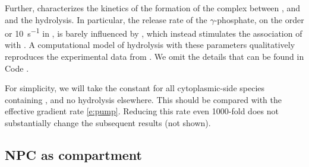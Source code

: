 \documentclass[12pt,notitlepage]{article}
\def\[#1\]{\begin{align}#1\end{align}}
\begin{document}
%


%

Further,
\cite[\href{https://i.ibb.co/jz37PW1/image.png}{Fig.~13}]{SeewaldETAL2003}
characterizes
the kinetics of the formation of the complex
between
,  and 
and the hydrolysis.
%
%
In particular, 
the release rate of the $\gamma$-phosphate,
on the order or \SI{10}{s^{-1}} in 
\cite[\href{https://i.ibb.co/jz37PW1/image.png}{Fig.~13}]{SeewaldETAL2003},
is barely influenced by ,
which instead stimulates
the association of  with .
%
%
%
A computational model of hydrolysis
with these parameters qualitatively reproduces
the experimental data from
\cite[\href{https://i.ibb.co/6ghqPB7/image.jpg}{Fig.~4A}]{LounsburyMacara1997}.
%
%
We omit the details
that can be found in Code \protect{}.

%

For simplicity,
we will take the constant
\[
	\label{e:hydrolysis}
\]
for all cytoplasmic-side species containing ,
and
no  hydrolysis elsewhere.
%
%
This should be compared with 
the effective  gradient rate \eqref{e:pump}.
%
%
Reducing this rate even 1000-fold
does not substantially change the subsequent results
(not shown).









\subsection{NPC as compartment} \label{ss:3s}
\end{document}

